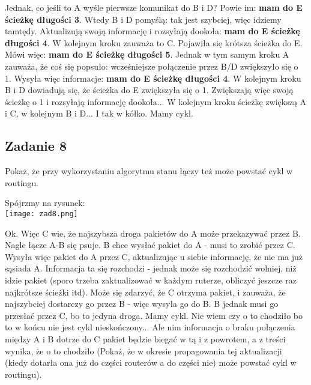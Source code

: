 \documentclass[a4paper]{article}
\begin{document}
Jednak, co jeśli to A wyśle pierwsze komunikat do B i D? Powie im: \textbf{mam do E ścieżkę długości 3}. Wtedy B i D pomyślą: tak jest szybciej, więc idziemy tamtędy. Aktualizują swoją informację i rozsyłają dookoła: \textbf{mam do E ścieżkę długości 4}. W kolejnym kroku zauważa to C. Pojawiła się krótsza ścieżka do E. Mówi więc: \textbf{mam do E ścieżkę długości 5}. Jednak w tym samym kroku A zauważa, że coś się popsuło: wcześniejsze połączenie przez B/D zwiększyło się o 1. Wysyła więc informacje: \textbf{mam do E ścieżkę długości 4}. W kolejnym kroku B i D dowiadują się, że ścieżka do E zwiększyła się o 1. Zwiększają więc swoją ścieżkę o 1 i rozsyłają informację dookoła... W kolejnym kroku ścieżkę zwiększą A i C, w kolejnym B i D... I tak w kółko. Mamy cykl.
\clearpage
\subsection*{Zadanie 8}
Pokaż, że przy wykorzystaniu algorytmu stanu łączy też może powstać cykl w routingu.

Spójrzmy na rysunek:\\
\texttt{[image: zad8.png]}

Ok. Więc C wie, że najszybsza droga pakietów do A może przekazywać przez B. Nagle łącze A-B się psuje. B chce wysłać pakiet do A - musi to zrobić przez C. Wysyła więc pakiet do A przez C, aktualizując u siebie informację, że nie ma już sąsiada A. Informacja ta się rozchodzi - jednak może się rozchodzić wolniej, niż idzie pakiet (sporo trzeba zaktualizować w każdym ruterze, obliczyć jeszcze raz najkrótsze ścieżki itd). Może się zdarzyć, że C otrzyma pakiet, i zauważa, że najszybciej dostarczy go przez B - więc wysyła go do B. B jednak musi go przesłać przez C, bo to jedyna droga. Mamy cykl. Nie wiem czy o to chodziło bo to w końcu nie jest cykl nieskończony... Ale nim informacja o braku połączenia między A i B dotrze do C pakiet będzie biegać w tą i z powrotem, a z treści wynika, że o to chodziło (Pokaż, że w okresie
propagowania tej aktualizacji (kiedy dotarła ona już do części routerów a do części nie) może powstać
cykl w routingu).
\end{document}
